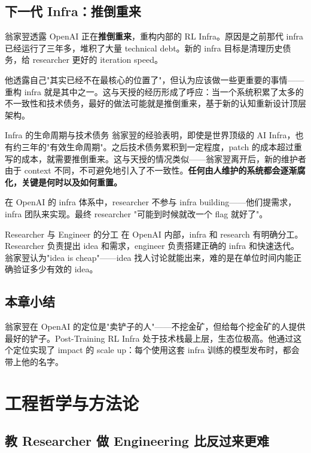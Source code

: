 \documentclass[a4paper]{article}
\begin{document}
\subsection{下一代 Infra：推倒重来}

翁家翌透露 OpenAI 正在\textbf{推倒重来}，重构内部的 RL Infra。原因是之前那代 infra 已经运行了三年多，堆积了大量 technical debt。新的 infra 目标是清理历史债务，给 researcher 更好的 iteration speed。

他透露自己"其实已经不在最核心的位置了"，但认为应该做一些更重要的事情——重构 infra 就是其中之一。这与天授的经历形成了呼应：当一个系统积累了太多的不一致性和技术债务，最好的做法可能就是推倒重来，基于新的认知重新设计顶层架构。

\begin{warningbox}{Infra 的生命周期与技术债务}
翁家翌的经验表明，即使是世界顶级的 AI Infra，也有约三年的"有效生命周期"。之后技术债务累积到一定程度，patch 的成本超过重写的成本，就需要推倒重来。这与天授的情况类似——翁家翌离开后，新的维护者由于 context 不同，不可避免地引入了不一致性。\textbf{任何由人维护的系统都会逐渐腐化，关键是何时以及如何重置。}
\end{warningbox}

在 OpenAI 的 infra 体系中，researcher 不参与 infra building——他们提需求，infra 团队来实现。最终 researcher "可能到时候就改一个 flag 就好了"。

\begin{knowledgebox}{Researcher 与 Engineer 的分工}
在 OpenAI 内部，infra 和 research 有明确分工。Researcher 负责提出 idea 和需求，engineer 负责搭建正确的 infra 和快速迭代。翁家翌认为"idea is cheap"——idea 找人讨论就能出来，难的是在单位时间内能正确验证多少有效的 idea。
\end{knowledgebox}

\subsection{本章小结}

翁家翌在 OpenAI 的定位是"卖铲子的人"——不挖金矿，但给每个挖金矿的人提供最好的铲子。Post-Training RL Infra 处于技术栈最上层，生态位极高。他通过这个定位实现了 impact 的 scale up：每个使用这套 infra 训练的模型发布时，都会带上他的名字。


\section{工程哲学与方法论}

\subsection{教 Researcher 做 Engineering 比反过来更难}
\end{document}

